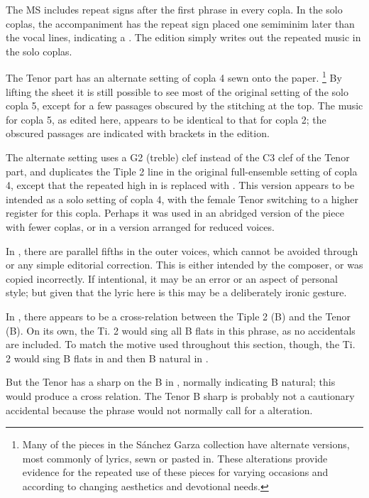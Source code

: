 The MS includes repeat signs after the first phrase in every copla. 
In the solo coplas, the accompaniment has the repeat sign placed one semiminim later than the vocal lines, indicating a .
The edition simply writes out the repeated music in the solo coplas.

The Tenor part has an alternate setting of copla 4 sewn onto the paper.%
  \footnote{Many of the pieces in the Sánchez Garza collection have alternate versions, most commonly of lyrics, sewn or pasted in. These alterations provide evidence for the repeated use of these pieces for varying occasions and according to changing aesthetics and devotional needs.}
By lifting the sheet it is still possible to see most of the original setting of the solo copla 5, except for a few passages obscured by the stitching at the top.
The music for copla 5, as edited here, appears to be identical to that for copla 2; the obscured passages are indicated with brackets in the edition.

The alternate setting uses a G2 (treble) clef instead of the C3 clef of the Tenor part, and duplicates the Tiple 2 line in the original full-ensemble setting of copla 4, except that the repeated high  in  is replaced with .
This version appears to be intended as a solo setting of copla 4, with the female Tenor switching to a higher register for this copla. 
Perhaps it was used in an abridged version of the piece with fewer coplas, or in a version arranged for reduced voices.



In , there are parallel fifths in the outer voices, which cannot be avoided through  or any simple editorial correction. 
This is either intended by the composer, or was copied incorrectly.
If intentional, it may be an error or an aspect of personal style; but given that the lyric here is  this may be a deliberately ironic gesture.

In , there appears to be a cross-relation between the Tiple 2 (B\fl) and the Tenor (B\na).
On its own, the Ti. 2 would sing all B flats in this phrase, as no accidentals are included.
To match the motive used throughout this section, though, the Ti. 2 would sing B flats in  and then B natural in .

But the Tenor has a sharp on the B in , normally indicating B natural; this would produce a cross relation.
The Tenor B sharp is probably not a cautionary accidental because the phrase would not normally call for a  alteration.

